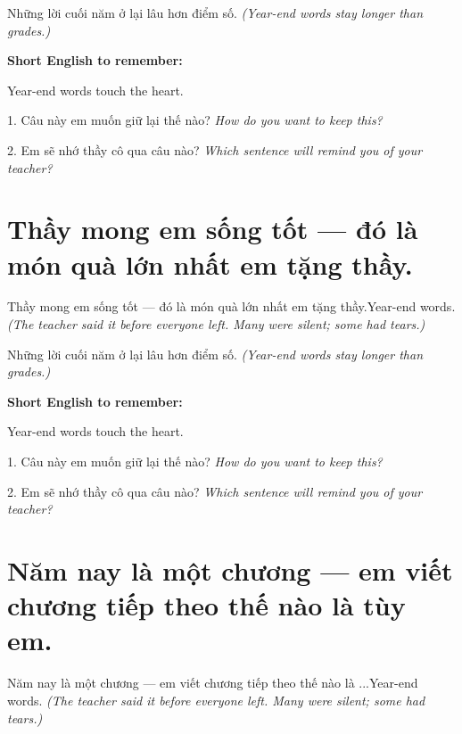 \begin{baihoc}
Những lời cuối năm ở lại lâu hơn điểm số.
\textit{(Year-end words stay longer than grades.)}
\end{baihoc}

\begin{ghinhoanh}
\textbf{Short English to remember:}

Year-end words touch the heart.

\end{ghinhoanh}

\begin{tuhocnhanh}
1. Câu này em muốn giữ lại thế nào? \textit{How do you want to keep this?}

2. Em sẽ nhớ thầy cô qua câu nào? \textit{Which sentence will remind you of your teacher?}
\end{tuhocnhanh}
\ngancach


\section{Thầy mong em sống tốt — đó là món quà lớn nhất em tặng thầy.}
\begin{truyen}{Thầy mong em sống tốt — đó là món quà lớn nhất em tặng thầy.}{Year-end words.}
\textit{(The teacher said it before everyone left. Many were silent; some had tears.)}
\end{truyen}

\begin{baihoc}
Những lời cuối năm ở lại lâu hơn điểm số.
\textit{(Year-end words stay longer than grades.)}
\end{baihoc}

\begin{ghinhoanh}
\textbf{Short English to remember:}

Year-end words touch the heart.

\end{ghinhoanh}

\begin{tuhocnhanh}
1. Câu này em muốn giữ lại thế nào? \textit{How do you want to keep this?}

2. Em sẽ nhớ thầy cô qua câu nào? \textit{Which sentence will remind you of your teacher?}
\end{tuhocnhanh}
\ngancach


\section{Năm nay là một chương — em viết chương tiếp theo thế nào là tùy em.}
\begin{truyen}{Năm nay là một chương — em viết chương tiếp theo thế nào là ...}{Year-end words.}
\textit{(The teacher said it before everyone left. Many were silent; some had tears.)}
\end{truyen}

